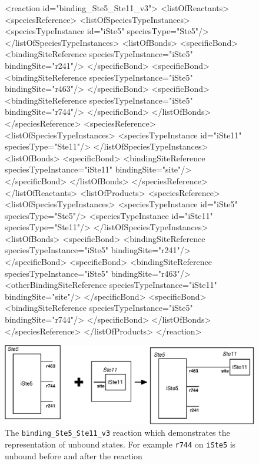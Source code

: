 \documentclass{cekarticle}
\begin{document}
\begin{figure}[h]
\begin{example}
<reaction id="binding_Ste5_Ste11_v3">
    <listOfReactants>
        <speciesReference>
            <listOfSpeciesTypeInstances>
                <speciesTypeInstance id="iSte5" speciesType="Ste5"/>
            </listOfSpeciesTypeInstances>
            <listOfBonds>
                <specificBond>
                    <bindingSiteReference speciesTypeInstance="iSte5" bindingSite="r241"/>
                </specificBond>
                <specificBond>
                    <bindingSiteReference speciesTypeInstance="iSte5" bindingSite="r463"/>
                </specificBond>
                <specificBond>
                    <bindingSiteReference speciesTypeInstance="iSte5" bindingSite="r744"/>
                </specificBond>
            </listOfBonds>
        </speciesReference>
        <speciesReference>
            <listOfSpeciesTypeInstances>
                <speciesTypeInstance id="iSte11" speciesType="Ste11"/>
            </listOfSpeciesTypeInstances>
            <listOfBonds>
                <specificBond>
                    <bindingSiteReference speciesTypeInstance="iSte11" bindingSite="site"/>
                </specificBond>
            </listOfBonds>
         </speciesReference>
    </listOfReactants>
    <listOfProducts>
        <speciesReference>
            <listOfSpeciesTypeInstances>
                <speciesTypeInstance id="iSte5" speciesType="Ste5"/>
                <speciesTypeInstance id="iSte11" speciesType="Ste11"/>
            </listOfSpeciesTypeInstances>
            <listOfBonds>
                <specificBond>
                    <bindingSiteReference speciesTypeInstance="iSte5" bindingSite="r241"/>
                </specificBond>
                <specificBond>
                    <bindingSiteReference speciesTypeInstance="iSte5" bindingSite="r463"/>
                    <otherBindingSiteReference
                        speciesTypeInstance="iSte11" bindingSite="site"/>
                </specificBond>
                <specificBond>
                    <bindingSiteReference speciesTypeInstance="iSte5" bindingSite="r744"/>
                </specificBond>
            </listOfBonds>
        </speciesReference>
    </listOfProducts>
</reaction>
\end{example}
  \vspace*{8pt}
  \centering
  \includegraphics[scale = 0.7]{binding_Ste5_Ste11_v3.eps}
  \caption{The \texttt{binding\_Ste5\_Ste11\_v3} reaction which demonstrates the
  representation of unbound states. For example  \texttt{r744} on
   \texttt{iSte5} is unbound before and after the reaction}
  \label{fig:binding_Ste5_Ste11_v3}
\end{figure}
\end{document}
